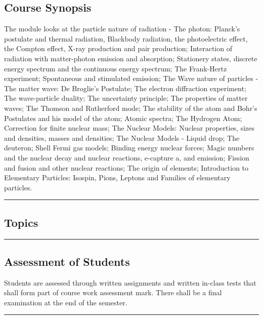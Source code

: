 \subsection*{Course Synopsis}
The module looks at the particle nature of radiation - The photon: Planck's postulate and thermal
radiation, Blackbody radiation, the photoelectric effect, the Compton effect, X-ray production
and pair production; Interaction of radiation with matter-photon emission and absorption;
Stationery states, discrete energy spectrum and the continuous energy spectrum; The Frank-Hertz
experiment; Spontaneous and stimulated emission; The Wave nature of particles - The matter
wave: De Broglie's Postulate; The electron diffraction experiment; The wave-particle duality;
The uncertainty principle; The properties of matter waves; The Thomson and Rutherford mode;
The stability of the atom and Bohr's Postulates and his model of the atom; Atomic spectra; The
Hydrogen Atom; Correction for finite nuclear mass; The Nuclear Models: Nuclear properties,
sizes and densities, masses and densities; The Nuclear Models - Liquid drop; The deuteron; Shell
Fermi gas models; Binding energy nuclear forces; Magic numbers and the nuclear decay and
nuclear reactions, e-capture a, and emission; Fission and fusion and other nuclear reactions; The
origin of elements; Introduction to Elementary Particles: Isospin, Pions, Leptons and Families of
elementary particles.
\vspace{2ex} \hrule\vspace{2ex}
\subsection*{Topics}
\begin{outline}
    \1
    \1
    \1
    \1
    \1
\end{outline}
\vspace{2ex} \hrule\vspace{2ex}

\subsection*{Assessment of Students}
\begin{outline}
    \1 Students are assessed through written assignments and written in-class tests that shall form part of course work assessment mark.
    \1 There shall be a final examination at the end of the semester.
\end{outline}
\vspace{2ex}\hrule\vspace{2ex}

